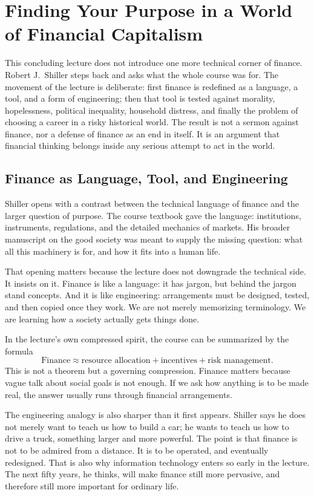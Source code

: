 \chapter{Finding Your Purpose in a World of Financial Capitalism}

This concluding lecture does not introduce one more technical corner of finance. Robert J.~Shiller steps back and asks what the whole course was for. The movement of the lecture is deliberate: first finance is redefined as a language, a tool, and a form of engineering; then that tool is tested against morality, hopelessness, political inequality, household distress, and finally the problem of choosing a career in a risky historical world. The result is not a sermon against finance, nor a defense of finance as an end in itself. It is an argument that financial thinking belongs inside any serious attempt to act in the world.

\section{Finance as Language, Tool, and Engineering}

Shiller opens with a contrast between the technical language of finance and the larger question of purpose. The course textbook gave the language: institutions, instruments, regulations, and the detailed mechanics of markets. His broader manuscript on the good society was meant to supply the missing question: what all this machinery is for, and how it fits into a human life.

That opening matters because the lecture does not downgrade the technical side. It insists on it. Finance is like a language: it has jargon, but behind the jargon stand concepts. And it is like engineering: arrangements must be designed, tested, and then copied once they work. We are not merely memorizing terminology. We are learning how a society actually gets things done.

In the lecture's own compressed spirit, the course can be summarized by the formula
\begin{equation}
\text{Finance} \approx \text{resource allocation} + \text{incentives} + \text{risk management}.
\end{equation}
This is not a theorem but a governing compression. Finance matters because vague talk about social goals is not enough. If we ask how anything is to be made real, the answer usually runs through financial arrangements.

The engineering analogy is also sharper than it first appears. Shiller says he does not merely want to teach us how to build a car; he wants to teach us how to drive a truck, something larger and more powerful. The point is that finance is not to be admired from a distance. It is to be operated, and eventually redesigned. That is also why information technology enters so early in the lecture. The next fifty years, he thinks, will make finance still more pervasive, and therefore still more important for ordinary life.

